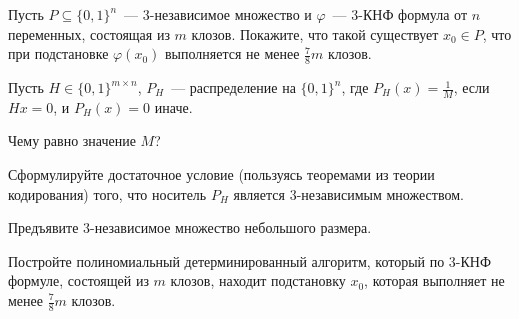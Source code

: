 \begin{enumtask}
    \item Пусть $P \subseteq \{0, 1\}^n$~--- $3$-независимое множество и $\varphi$~--- $3$-КНФ формула от
        $n$ переменных, состоящая из $m$ клозов. Покажите, что такой существует $x_0 \in P$, что при
        подстановке $\varphi(x_0)$ выполняется не менее $\frac{7}{8}m$ клозов.
    \item Пусть $H \in \{0, 1\}^{m \times n}$, $P_H$~--- распределение на $\{0, 1\}^n$, где $P_H(x) =
        \frac{1}{M}$, если $H x = 0$, и $P_H(x) = 0$ иначе.
        \begin{enumcyr}
            \item Чему равно значение $M$?
            \item Сформулируйте достаточное условие (пользуясь теоремами из теории кодирования) того, что
                носитель $P_H$ является $3$-независимым множеством.
            \item Предъявите $3$-независимое множество небольшого размера.
        \end{enumcyr}
    \item Постройте полиномиальный детерминированный алгоритм, который по $3$-КНФ формуле, состоящей из
        $m$ клозов, находит подстановку $x_0$, которая выполняет не менее $\frac{7}{8}m$ клозов.
\end{enumtask}